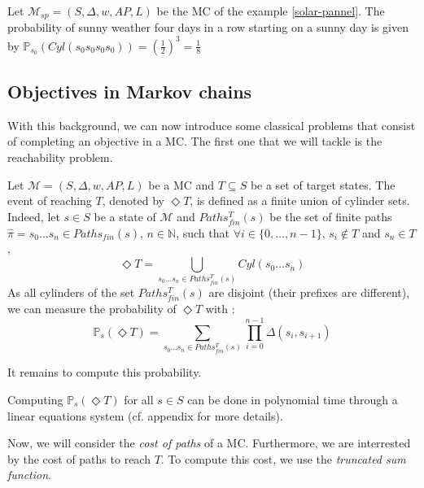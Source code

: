 \begin{example}
  Let $\mathcal{M}_{sp} = (S, \Delta, w, AP, L)$ be the MC of the example \ref{solar-pannel}. The probability of sunny weather four days in a row starting on a sunny day is given
  by $\mathbb{P}_{s_0}(Cyl(s_0s_0s_0s_0)) = (\frac{1}{2})^3 = \frac{1}{8}$
\end{example}

\subsection{Objectives in Markov chains}

With this background, we can now introduce some classical problems that consist
of completing an objective in a MC. The first one that we will tackle is the reachability problem.
\begin{definition}
  Let $\mathcal{M} = (S, \Delta, w, AP, L)$ be a MC and $T \subseteq S$ be a set of target states. The event of reaching $T$, denoted by $\Diamond T$,
  is defined as a finite union of cylinder sets. Indeed, let $s \in S$ be a state of $\mathcal{M}$ and $Paths_{fin}^T(s)$ be the set of finite paths $\hat{\pi} = s_0 \dots s_n \in Paths_{fin}(s)$, $n \in \mathbb{N}$, such that $\forall i \in \{0, \dots, n-1 \}, \, s_i \not \in T$ and $s_n \in T$,
  \[ \Diamond T = \bigcup_{s_0 \dots s_n \in Paths_{fin}^T(s)} Cyl(s_0 \dots s_n) \]
  As all cylinders of the set $Paths_{fin}^T(s)$ are disjoint (their prefixes are different), we can measure the probability of $\Diamond T$ with :
  \[
    \mathbb{P}_s(\Diamond T) = \sum_{s_0 \dots s_n \in Paths_{fin}^T(s)} %
    \prod_{i=0}^{n-1} \Delta(s_i, s_{i+1})
  \]
\end{definition}
It remains to compute this probability.

\begin{theorem}
Computing $\mathbb{P}_s(\Diamond T)$ for all $s \in S$ can be done in polynomial
time through a linear equations system (cf. appendix for more details).
\end{theorem}

Now, we will consider the \textit{cost of paths} of a MC. Furthermore, we
are interrested by the cost of paths to reach $T$. To compute this cost, we use the \textit{truncated sum function}.

